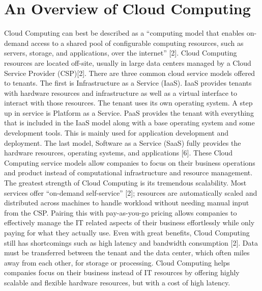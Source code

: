 \documentclass[conference]{IEEEtran}
\begin{document}
{\section{An Overview of Cloud Computing}
Cloud Computing can best be described as a “computing model that enables on-demand access to a shared pool of configurable computing resources, such as servers, storage, and applications, over the internet” [2]. Cloud Computing resources are located off-site, usually in large data centers managed by a Cloud Service Provider (CSP)[2]. There are three common cloud service models offered to tenants. The first is Infrastructure as a Service (IaaS). IaaS provides tenants with hardware resources and infrastructure as well as a virtual interface to interact with those resources. The tenant uses its own operating system. A step up in service is Platform as a Service. PaaS provides the tenant with everything that is included in the IaaS model along with a base operating system and some development tools. This is mainly used for application development and deployment. The last model, Software as a Service (SaaS) fully provides the hardware resources, operating systems, and applications [6]. These Cloud Computing service models allow companies to focus on their business operations and product instead of computational infrastructure and resource management.
The greatest strength of Cloud Computing is its tremendous scalability. Most services offer “on-demand self-service” [2]; resources are automatically scaled and distributed across machines to handle workload without needing manual input from the CSP. Pairing this with pay-as-you-go pricing allows companies to effectively manage the IT related aspects of their business effortlessly while only paying for what they actually use. Even with great benefits, Cloud Computing still has shortcomings such as high latency and bandwidth consumption [2]. Data must be transferred between the tenant and the data center, which often miles away from each other, for storage or processing. Cloud Computing helps companies focus on their business instead of IT resources by offering highly scalable and flexible hardware resources, but with a cost of high latency.

}
\end{document}
